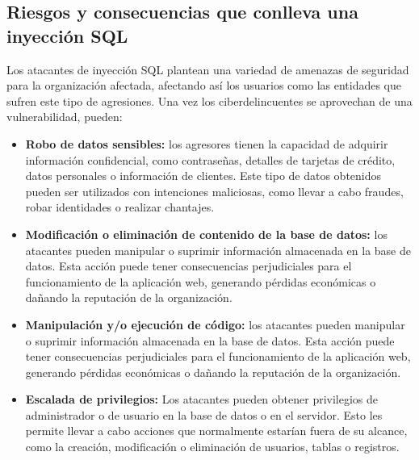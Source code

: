 \documentclass[11pt]{report}
\begin{document}
\subsection{Riesgos y consecuencias que conlleva una inyección SQL}
Los atacantes de inyección SQL plantean una variedad de amenazas de seguridad para la
organización afectada, afectando así los usuarios como las entidades que sufren este tipo
de agresiones. Una vez los ciberdelincuentes se aprovechan de una vulnerabilidad, pueden:
\begin{itemize}
\item \textbf{Robo de datos sensibles:} los agresores tienen la capacidad de adquirir información
confidencial, como contraseñas, detalles de tarjetas de crédito, datos personales o
información de clientes. Este tipo de datos obtenidos pueden ser utilizados con
intenciones maliciosas, como llevar a cabo fraudes, robar identidades o realizar
chantajes.
\item \textbf{Modificación o eliminación de contenido de la base de datos:} los atacantes pueden
manipular o suprimir información almacenada en la base de datos. Esta acción
puede tener consecuencias perjudiciales para el funcionamiento de la aplicación
web, generando pérdidas económicas o dañando la reputación de la organización.
\item \textbf{Manipulación y/o ejecución de código:} los atacantes pueden manipular o suprimir
información almacenada en la base de datos. Esta acción puede tener
consecuencias perjudiciales para el funcionamiento de la aplicación web, generando
pérdidas económicas o dañando la reputación de la organización.
\item \textbf{Escalada de privilegios:} Los atacantes pueden obtener privilegios de administrador o
de usuario en la base de datos o en el servidor. Esto les permite llevar a cabo
acciones que normalmente estarían fuera de su alcance, como la creación,
modificación o eliminación de usuarios, tablas o registros.
\end{itemize}

\cleardoublepage

\end{document}
